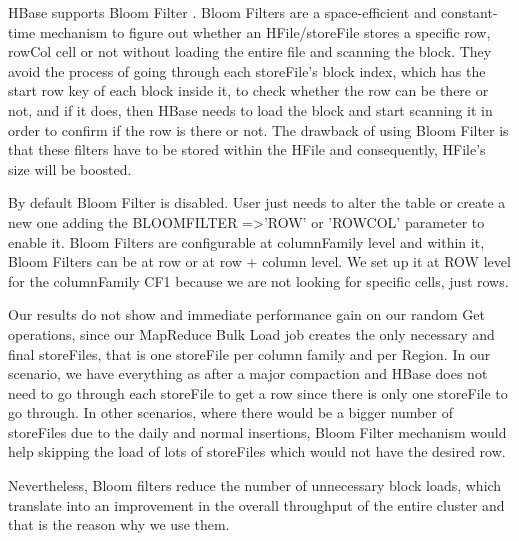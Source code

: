 \begin{itemize}
HBase supports Bloom Filter \cite{bloom1970space}. Bloom Filters are a space-efficient and constant-time mechanism to figure out whether an HFile/storeFile stores a specific row, rowCol cell or not without loading the entire file and scanning the block. They avoid the process of going through each storeFile's block index, which has the start row key of each block inside it, to check whether the row can be there or not, and if it does, then HBase needs to load the block and start scanning it in order to confirm if the row is there or not. The drawback of using Bloom Filter is that these filters have to be stored within the HFile and consequently, HFile's size will be boosted. 
\par
By default Bloom Filter is disabled. User just needs to alter the table or create a new one adding the BLOOMFILTER =\textgreater 'ROW' or 'ROWCOL' parameter to enable it. Bloom Filters are configurable at columnFamily level and within it, Bloom Filters can be at row or at row + column level. We set up it at ROW level for the columnFamily CF1 because we are not looking for specific cells, just rows.
\bigskip

Our results do not show and immediate performance gain on our random Get operations, since our MapReduce Bulk Load job creates the only necessary and final storeFiles, that is one storeFile per column family and per Region. In our scenario, we have everything as after a major compaction and HBase does not need to go through each storeFile to get a row since there is only one storeFile to go through. In other scenarios, where there would be a bigger number of storeFiles due to the daily and normal insertions, Bloom Filter mechanism would help skipping the load of lots of storeFiles which would not have the desired row.
\par
Nevertheless, Bloom filters reduce the number of unnecessary block loads, which translate into an improvement in the overall throughput of the entire cluster and that is the reason why we use them.



 


\end{itemize}











